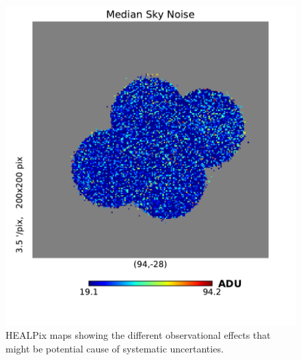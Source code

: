 \documentclass[\docopts]{\docclass}
\begin{document}
\begin{figure}
\includegraphics[width=0.9\columnwidth]{median_skynoise_2048.pdf}
\caption{HEALPix maps showing the different observational effects that might be potential cause of systematic uncertanties.}
\label{fig:systematic_maps}
\end{figure}
\end{document}
